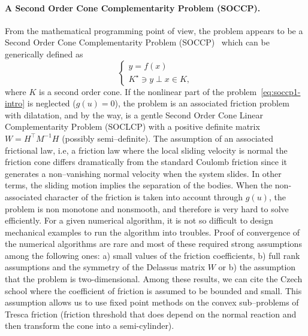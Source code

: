 

\paragraph{A Second Order Cone Complementarity Problem (SOCCP).}
From the mathematical programming point of view, the problem appears to be a Second Order Cone Complementarity Problem (SOCCP)~\cite{Facchinei.Pang2003} which can be generically defined as
\begin{equation}
  \begin{cases}
    y =f(x) \\
    K^\star \ni y \perp x \in K,
  \end{cases}
\end{equation}
where $K$ is a second order cone. If the nonlinear part of the problem~\eqref{eq:soccp1-intro} is neglected ($g(u)=0$), the problem is an associated friction problem with dilatation, and by the way, is a gentle Second Order Cone Linear Complementarity Problem (SOCLCP) with a positive definite matrix $W = H^\top M^{-1} H$ (possibly semi--definite). {The assumption of an associated frictional law, i.e, a friction law where the local sliding velocity is normal the friction cone differs dramatically from the standard Coulomb friction since it generates a non--vanishing normal velocity when the system slides. In other terms, the sliding motion implies the separation of the bodies.}
When the non-associated character of the friction is taken into account through $g(u)$, the problem is non monotone and nonsmooth, and therefore is very hard to solve efficiently. For a given numerical algorithm, it is not so difficult to design mechanical examples to run the algorithm into troubles.
{Proof of convergence} of the numerical algorithms are rare and most of these required strong assumptions among the following ones: a) small values of the friction coefficients, b) full rank assumptions and the symmetry of the Delassus matrix $W$ or b) the assumption that the problem is two-dimensional. Among these results, we can cite the Czech school where the coefficient of friction is assumed to be bounded and small. This assumption allows us to use fixed point methods on the convex sub--problems of Tresca friction {(friction threshold that does depend on the normal reaction and then transform the cone into a semi-cylinder)}.
